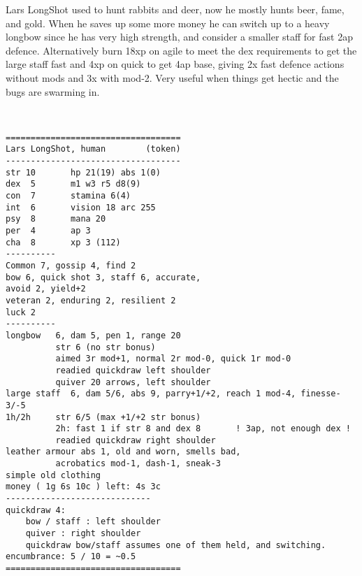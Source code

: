 \clearpage
\begin{samepage}

\noindent Lars LongShot used to hunt rabbits and deer, now he mostly hunts beer, fame, and gold.
When he saves up some more money he can switch up to a heavy longbow since he has very high strength, and consider a smaller staff for fast 2ap defence. Alternatively burn 18xp on agile to meet the dex requirements to get the large staff fast and 4xp on quick to get 4ap base, giving 2x fast defence actions without mods and 3x with mod-2. Very useful when things get hectic and the bugs are swarming in.

\

\small \begin{verbatim}
===================================
Lars LongShot, human        (token)
-----------------------------------
str 10       hp 21(19) abs 1(0)
dex  5       m1 w3 r5 d8(9)
con  7       stamina 6(4)
int  6       vision 18 arc 255
psy  8       mana 20
per  4       ap 3
cha  8       xp 3 (112)
----------
Common 7, gossip 4, find 2
bow 6, quick shot 3, staff 6, accurate,
avoid 2, yield+2
veteran 2, enduring 2, resilient 2
luck 2
----------
longbow   6, dam 5, pen 1, range 20
          str 6 (no str bonus)
          aimed 3r mod+1, normal 2r mod-0, quick 1r mod-0
          readied quickdraw left shoulder
          quiver 20 arrows, left shoulder
large staff  6, dam 5/6, abs 9, parry+1/+2, reach 1 mod-4, finesse-3/-5
1h/2h     str 6/5 (max +1/+2 str bonus)
          2h: fast 1 if str 8 and dex 8       ! 3ap, not enough dex !
          readied quickdraw right shoulder
leather armour abs 1, old and worn, smells bad,
          acrobatics mod-1, dash-1, sneak-3
simple old clothing
money ( 1g 6s 10c ) left: 4s 3c
-----------------------------
quickdraw 4:
    bow / staff : left shoulder
    quiver : right shoulder
    quickdraw bow/staff assumes one of them held, and switching.
encumbrance: 5 / 10 = ~0.5
===================================
\end{verbatim} \end{samepage} \normalsize





